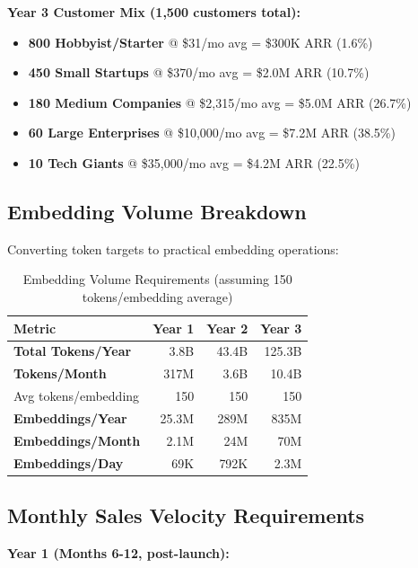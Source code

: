 \textbf{Year 3 Customer Mix (1,500 customers total):}
\begin{itemize}[noitemsep]
    \item \textbf{800 Hobbyist/Starter} @ \$31/mo avg = \$300K ARR (1.6\%)
    \item \textbf{450 Small Startups} @ \$370/mo avg = \$2.0M ARR (10.7\%)
    \item \textbf{180 Medium Companies} @ \$2,315/mo avg = \$5.0M ARR (26.7\%)
    \item \textbf{60 Large Enterprises} @ \$10,000/mo avg = \$7.2M ARR (38.5\%)
    \item \textbf{10 Tech Giants} @ \$35,000/mo avg = \$4.2M ARR (22.5\%)
\end{itemize}

\subsection{Embedding Volume Breakdown}

Converting token targets to practical embedding operations:

\begin{table}[ht]
\centering
\small
\begin{tabular}{|l|r|r|r|}
\hline
\textbf{Metric} & \textbf{Year 1} & \textbf{Year 2} & \textbf{Year 3} \\
\hline
\textbf{Total Tokens/Year} & 3.8B & 43.4B & 125.3B \\
\textbf{Tokens/Month} & 317M & 3.6B & 10.4B \\
\hline
Avg tokens/embedding & 150 & 150 & 150 \\
\hline
\textbf{Embeddings/Year} & 25.3M & 289M & 835M \\
\textbf{Embeddings/Month} & 2.1M & 24M & 70M \\
\textbf{Embeddings/Day} & 69K & 792K & 2.3M \\
\hline
\end{tabular}
\caption{Embedding Volume Requirements (assuming 150 tokens/embedding average)}
\end{table}

\subsection{Monthly Sales Velocity Requirements}

\textbf{Year 1 (Months 6-12, post-launch):}

